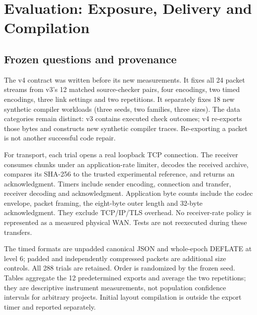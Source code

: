 \section{Evaluation: Exposure, Delivery and Compilation}\label{sec:evaluation}
\subsection{Frozen questions and provenance}
The v4 contract was written before its new measurements. It fixes all 24 packet streams from v3's 12 matched source-checker pairs, four encodings, two timed encodings, three link settings and two repetitions. It separately fixes 18 new synthetic compiler workloads (three seeds, two families, three sizes). The data categories remain distinct: v3 contains executed check outcomes; v4 re-exports those bytes and constructs new synthetic compiler traces. Re-exporting a packet is not another successful code repair.

For transport, each trial opens a real loopback TCP connection. The receiver consumes chunks under an application-rate limiter, decodes the received archive, compares its SHA-256 to the trusted experimental reference, and returns an acknowledgment. Timers include sender encoding, connection and transfer, receiver decoding and acknowledgment. Application byte counts include the codec envelope, packet framing, the eight-byte outer length and 32-byte acknowledgment. They exclude TCP/IP/TLS overhead. No receiver-rate policy is represented as a measured physical WAN. Tests are not reexecuted during these transfers.

The timed formats are unpadded canonical JSON and whole-epoch DEFLATE at level 6; padded and independently compressed packets are additional size controls. All 288 trials are retained. Order is randomized by the frozen seed. Tables aggregate the 12 predetermined exports and average the two repetitions; they are descriptive instrument measurements, not population confidence intervals for arbitrary projects. Initial layout compilation is outside the export timer and reported separately.


